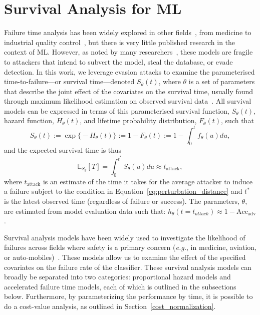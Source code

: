 \section{Survival Analysis for ML}
\label{aft_models}

Failure time analysis has been widely explored in other fields~\cite{aft_models}, from medicine to industrial quality control~\cite{ai_medical_imaging,ai_industry,ai_luggage}, but there is very little published research in the context of ML\@. 
However, as noted by many researchers~\cite{madry2017towards,carlini_towards_2017,meyers}, these models are fragile to attackers that intend to subvert the model, steal the database, or evade detection. 
In this work, we leverage evasion attacks to examine the parameterised time-to-failure---or survival time---denoted $S_{\theta}(t)$, where $\theta$ is a set of parameters that describe the joint effect of the covariates on the survival time, usually found through maximum likelihood estimation on observed survival data~\cite{collett2023modelling}. 
All survival models can be expressed in terms of this parameterised survival function, $S_\theta(t)$, hazard function, $H_\theta(t)$, and lifetime probability distribution, $F_{\theta}(t)$, such that
\[
	S_{\theta}(t) := \exp\big\{-H_{\theta}(t)\big\} := 1 - F_{\theta}(t) := 1 - \int_0^t f_\theta(u) du,
\]
and the expected survival time is thus
\[
	\mathbb{E}_{S_\theta}[T] =  \int_{0}^{t^*} S_{\theta}(u) du \approx t_{\mathrm{attack}},
\]
where $t_{\mathrm{attack}}$ is an estimate of the time it takes for the average attacker to induce a failure subject to the condition in Equation~\ref{eq:perturbation_distance} and $t^*$ is the latest observed time (regardless of failure or success). 
The parameters, $\theta$, are estimated from model evaluation data such that: $h_{\theta}(t=t_{attack}) \approx 1 - \mathrm{Acc}_{\mathrm{adv}}$.

Survival analysis models have been widely used to investigate the likelihood of failures across fields where safety is a primary concern (\textit{e.g.}, in medicine, aviation, or auto-mobiles)~\cite{liu2013development,lawless1995methods}. These models allow us to examine the effect of the specified covariates on the failure rate of the classifier. 
These survival analysis models can broadly be separated into two categories: proportional hazard models and accelerated failure time models, each of which is outlined in the subsections below. 
Furthermore, by parameterizing the performance by time, it is possible to do a cost-value analysis, as outlined in Section~\ref{cost_normalization}.


